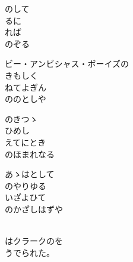 \documentclass[10pt,b5j]{tarticle} %
\begin{document}
\vspace{1.5em} %
\newcommand{\linespace}{0.5em} %
\newcommand{\blocksize}{0.5\hsize} %
\begin{enumerate} %
    \begin{minipage}[c]{\blocksize}
    
        \vspace{\linespace}
        \item
        のして\\
        るに\\
        れば\\
        のぞる
        
        \vspace{\linespace}
        \item
        ビー・アンビシャス・ボーイズの\\
        きもしく\\
        ねてよぎん\\
        ののとしや
        
        \vspace{\linespace}
        \item
        のきつゝ\\
        ひめし\\
        えてにとき\\
        のほまれなる
        
        \vspace{\linespace}
        \item
        あゝはとして\\
        のやりゆる\\
        いざよひて\\
        のかざしはずや
        
        
        \vspace{\linespace}
        \item
        \\
        はクラークのを\\
        うでられた。
    
    \end{minipage}
\end{enumerate} %
\end{document}
